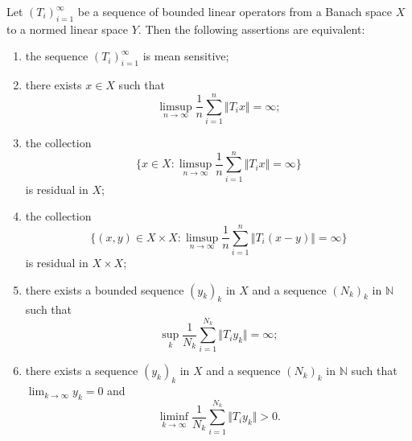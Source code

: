 \documentclass[10pt,a4paper]{amsart}
\begin{document}
\begin{thm} \label{thm:mean-sensitive}
    Let $(T_i)_{i=1}^{\infty}$ be a sequence of bounded linear operators from a Banach space $X$ to a normed linear space $Y$.
    Then the following assertions are equivalent:
    \begin{enumerate}
        \item \label{thm1: mean sensitive}
              the sequence $(T_i)_{i=1}^{\infty}$  is mean sensitive;
        \item \label{thm2: x unbounded}
              there exists $x\in X$ such that
              \[
                  \limsup_{n\to{\infty}}\frac{1}{n}\sum_{i=1}^{n}\Vert T_i x\Vert=\infty;
              \]
        \item \label{thm3: residual points in X}
              the collection
              \[
                  \biggl \{ x\in X\colon \limsup_{n\to{\infty}}\frac{1}{n}\sum_{i=1}^{n} \Vert T_i x\Vert=\infty \biggr \}
              \]
              is residual in $X$;

        \item \label{thm4: residual points in X*X}
              the collection
              \[
                  \biggl\{ (x,y)\in X\times X\colon \limsup_{n\to{\infty}}\frac{1}{n}\sum_{i=1}^{n}\Vert T_i (x-y)\Vert=\infty \biggr \}
              \]
              is residual in $X\times X$;

        \item \label{thm5: bounded sequence}
              there exists a bounded sequence  $(y_k)_k$ in $X$ and a sequence $(N_k)_k$ in $\mathbb{N}$ such that
              \[
                  \sup_k\frac{1}{N_k}\sum_{i=1}^{N_k}\Vert T_i y_k\Vert=\infty;
              \]
        \item \label{thm6: sequence to 0}
              there exists a sequence  $(y_k)_k$ in $X$ and a sequence $(N_k)_k$ in $\mathbb{N}$ such that $\lim_{k\to\infty}y_k=0$ and
              \[
                  \liminf_{k\to\infty} \frac{1}{N_k}\sum_{i=1}^{N_k}\Vert T_i y_k\Vert>0.
              \]
    \end{enumerate}
\end{thm}
\end{document}
